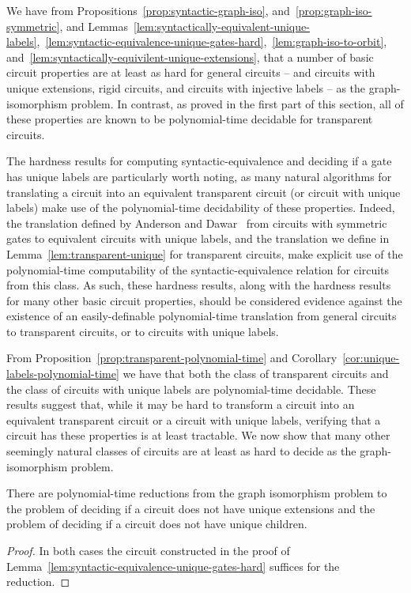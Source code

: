 \documentclass[../main/thesis.tex]{subfiles}
\begin{document}
We have from Propositions~\ref{prop:syntactic-graph-iso},
and~\ref{prop:graph-iso-symmetric}, and
Lemmas~\ref{lem:syntactically-equivalent-unique-labels},~\ref{lem:syntactic-equivalence-unique-gates-hard},~\ref{lem:graph-iso-to-orbit},
and~\ref{lem:syntactically-equivilent-unique-extensions}, that a number of basic
circuit properties are at least as hard for general circuits -- and circuits
with unique extensions, rigid circuits, and circuits with injective labels -- as
the graph-isomorphism problem. In contrast, as proved in the first part of this
section, all of these properties are known to be polynomial-time decidable for
transparent circuits.

The hardness results for computing syntactic-equivalence and deciding if a gate
has unique labels are particularly worth noting, as many natural algorithms for
translating a circuit into an equivalent transparent circuit (or circuit with
unique labels) make use of the polynomial-time decidability of these properties.
Indeed, the translation defined by Anderson and Dawar~\cite{AndersonD17} from
circuits with symmetric gates to equivalent circuits with unique labels, and the
translation we define in Lemma~\ref{lem:transparent-unique} for transparent
circuits, make explicit use of the polynomial-time computability of the
syntactic-equivalence relation for circuits from this class. As such, these
hardness results, along with the hardness results for many other basic circuit
properties, should be considered evidence against the existence of an
easily-definable polynomial-time translation from general circuits to
transparent circuits, or to circuits with unique labels.

From Proposition~\ref{prop:transparent-polynomial-time} and
Corollary~\ref{cor:unique-labels-polynomial-time} we have that both the class of
transparent circuits and the class of circuits with unique labels are
polynomial-time decidable. These results suggest that, while it may be hard to
transform a circuit into an equivalent transparent circuit or a circuit with
unique labels, verifying that a circuit has these properties is at least
tractable. We now show that many other seemingly natural classes of circuits are
at least as hard to decide as the graph-isomorphism problem.

\begin{lem}
  There are polynomial-time reductions from the graph isomorphism problem to the
  problem of deciding if a circuit does not have unique extensions and the
  problem of deciding if a circuit does not have unique children.
  \label{lem:unique-extensions-hard}
\end{lem}
\begin{proof}
  In both cases the circuit constructed in the proof of
  Lemma~\ref{lem:syntactic-equivalence-unique-gates-hard} suffices for the
  reduction.
\end{proof}
\end{document}
